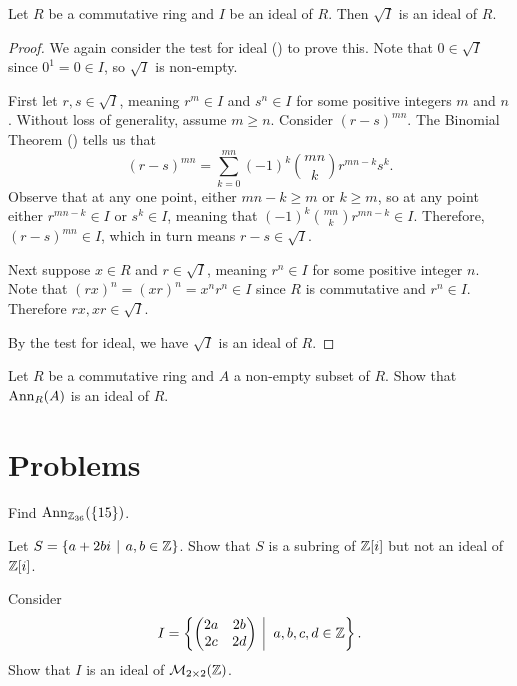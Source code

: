 \begin{proposition}
    Let $R$ be a commutative ring and $I$ be an ideal of $R$. Then $\sqrt{I}$ is an ideal of $R$.
\end{proposition}
\begin{proof}
    We again consider the test for ideal () to prove this. Note that $0 \in \sqrt{I}$ since $0^1 = 0 \in I$, so $\sqrt{I}$ is non-empty.

    First let $r, s \in \sqrt{I}$, meaning $r^m \in I$ and $s^n \in I$ for some positive integers $m$ and $n$. Without loss of generality, assume $m \geq n$. Consider $(r-s)^{mn}$. The Binomial Theorem () tells us that
    \[
        (r-s)^{mn} = \sum_{k=0}^{mn}(-1)^k{mn \choose k}r^{mn-k}s^k.
    \]
    Observe that at any one point, either $mn - k \geq m$ or $k \geq m$, so at any point either $r^{mn-k} \in I$ or $s^k \in I$, meaning that $(-1)^k{mn \choose k}r^{mn-k} \in I$. Therefore, $(r-s)^{mn} \in I$, which in turn means $r-s \in \sqrt{I}$.

    Next suppose $x \in R$ and $r \in \sqrt{I}$, meaning $r^n \in I$ for some positive integer $n$. Note that $(rx)^n = (xr)^n = x^nr^n \in I$ since $R$ is commutative and $r^n \in I$. Therefore $rx, xr \in \sqrt{I}$.

    By the test for ideal, we have $\sqrt{I}$ is an ideal of $R$.
\end{proof}

\begin{exercise}\label{exercise-annihilator-is-an-ideal}
    Let $R$ be a commutative ring and $A$ a non-empty subset of $R$. Show that $\mathrm{Ann}_{R}(A)$ is an ideal of $R$.
\end{exercise}

\newpage

\section{Problems}
\begin{problem}
    Find $\mathrm{Ann}_{\mathbb{Z}_{36}}(\{15\})$.
\end{problem}

\begin{problem}
    Let $S = \{a + 2bi \vert a, b \in \Z\}$. Show that $S$ is a subring of $\mathbb{Z}[i]$ but not an ideal of $\mathbb{Z}[i]$.
\end{problem}

\begin{problem}
    Consider
    \[
        I = \left\{\begin{pmatrix}2a&2b\\2c&2d\end{pmatrix} \vert a,b,c,d \in \Z\right\}.
    \]
    Show that $I$ is an ideal of $\mathcal{M}_{2\times2}(\mathbb{Z})$.
\end{problem}

